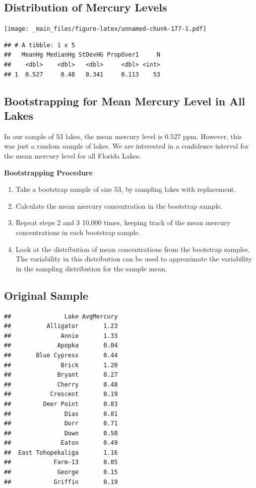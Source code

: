 \documentclass[]{book}
\begin{document}
\subsection{Distribution of Mercury
Levels}\label{distribution-of-mercury-levels}

\texttt{[image: \_main\_files/figure-latex/unnamed-chunk-177-1.pdf]}

\begin{verbatim}
## # A tibble: 1 x 5
##   MeanHg MedianHg StDevHG PropOver1     N
##    <dbl>    <dbl>   <dbl>     <dbl> <int>
## 1  0.527     0.48   0.341     0.113    53
\end{verbatim}

\subsection{Bootstrapping for Mean Mercury Level in All
Lakes}\label{bootstrapping-for-mean-mercury-level-in-all-lakes}

In our sample of 53 lakes, the mean mercury level is 0.527 ppm. However,
this was just a random sample of lakes. We are interested in a
confidence interval for the mean mercury level for all Florida Lakes.

\textbf{Bootstrapping Procedure}

\begin{enumerate}
\def\labelenumi{\arabic{enumi}.}
\item
  Take a bootstrap sample of size 53, by sampling lakes with
  replacement.
\item
  Calculate the mean mercury concentration in the bootstrap sample.
\item
  Repeat steps 2 and 3 10,000 times, keeping track of the mean mercury
  concentrations in each bootstrap sample.
\item
  Look at the distribution of mean concentrations from the bootstrap
  samples. The variability in this distribution can be used to
  approximate the variability in the sampling distribution for the
  sample mean.
\end{enumerate}

\subsection{Original Sample}\label{original-sample}

\begin{verbatim}
##               Lake AvgMercury
##          Alligator       1.23
##              Annie       1.33
##             Apopka       0.04
##       Blue Cypress       0.44
##              Brick       1.20
##             Bryant       0.27
##             Cherry       0.48
##           Crescent       0.19
##         Deer Point       0.83
##               Dias       0.81
##               Dorr       0.71
##               Down       0.50
##              Eaton       0.49
##  East Tohopekaliga       1.16
##            Farm-13       0.05
##             George       0.15
##            Griffin       0.19
\end{verbatim}
\end{document}
